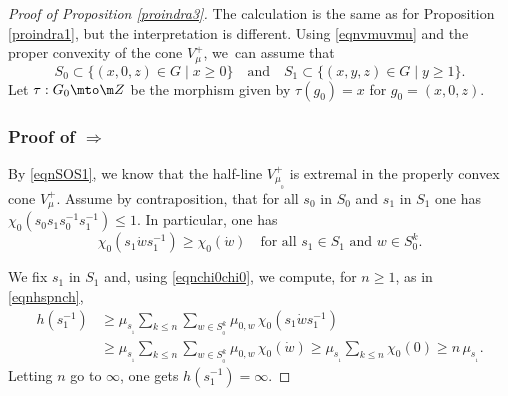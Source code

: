 \begin{proof}[Proof of Proposition \ref{proindra3}]
The calculation is the same as for Proposition \ref{proindra1},
but the interpretation is different.
Using \eqref{eqnvmuvmu} and the proper convexity of the cone $V_\mu^+$,
we~can assume that\vspace*{-3pt}
\begin{equation}
\label{eqnSOS1}
S_0\subset \{ (x,0,z)\in G\mid x\geq 0\}
\quad\text{and}\quad
S_1\subset \{ (x,y,z)\in G\mid y\geq 1\}.
\end{equation}
Let $\tau:G_0\mto \m Z$ be the morphism given by
$\tau(g_0)=x$ for $g_0=(x,0,z)$.

\subsubsection*{Proof of $\Rightarrow$}
By \eqref{eqnSOS1}, we know that the half-line $V^+_{\mu_{_0}}$ is extremal
in the properly convex cone $V^+_\mu$.
Assume by contraposition, that
for all $s_0$ in $S_0$ and $s_1$ in $S_1$
one has $\chi_0(s_0s_1s_0^{-1}s_1^{-1})\leq 1$.
In particular, one has\vspace*{-3pt}
\begin{equation}
\label{eqnchi0chi0}
\chi_0(s_1\dot{w}s_1^{-1})
\geq \chi_0(\dot{w})
\quad\text{for all $s_1\in S_1$ and $w\in S_0^k$.}
\end{equation}

We fix $s_1$ in $S_1$ and, using \eqref{eqnchi0chi0}, we compute, for $n\geq 1$, as in \eqref{eqnhspnch},\vspace*{-3pt}
\begin{align*}
h(s_1^{-1})
&\geq
\mu_{s_{_1}}\sum_{k\leq n}
\sum_{w\in S_{_0}^k}\mu_{0,w}\,\chi_0(s_1\dot{w}s_1^{-1})\\[-3pt]
&\geq
\mu_{s_{_1}}\sum_{k\leq n}
\sum_{w\in S_{_0}^k}\mu_{0,w}\,\chi_0(\dot{w})\geq
\mu_{s_{_1}}\sum_{k\leq n}\chi_0(0)
\geq n\, \mu_{s_{_1}}.
\end{align*}
Letting $n$ go to $\infty$, one gets
$h(s_1^{-1})=\infty$.


\end{proof}
